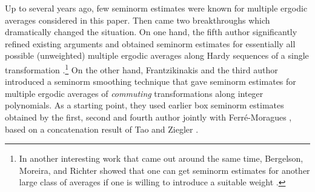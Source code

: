 \documentclass[11pt]{amsart}
\theoremstyle{definition}
\newcommand{\1}{{\mathbf{1}}}
\begin{document}
Up to several years ago, few seminorm estimates were known for multiple ergodic averages considered in this paper. Then came two breakthroughs which dramatically changed the situation. On one hand, the fifth author significantly refined existing arguments and obtained seminorm estimates for essentially all possible (unweighted) multiple ergodic averages along Hardy sequences of a single transformation \cite{Ts22}.\footnote{In another interesting work that came out around the same time, Bergelson, Moreira, and Richter showed that one can get seminorm estimates for another large class of averages if one is willing to introduce a suitable weight \cite{BMR20}.} On the other hand, Frantzikinakis and the third author introduced a seminorm smoothing technique \cite{FrKu22b, FrKu22a} that gave seminorm estimates for multiple ergodic averages of \textit{commuting} transformations along integer polynomials. As a starting point, they used earlier box seminorm estimates obtained by the first, second and fourth author jointly with Ferr\'e-Moragues \cite{DFKS22}, based on a concatenation result of Tao and Ziegler \cite{TZ16}. 
\end{document}
